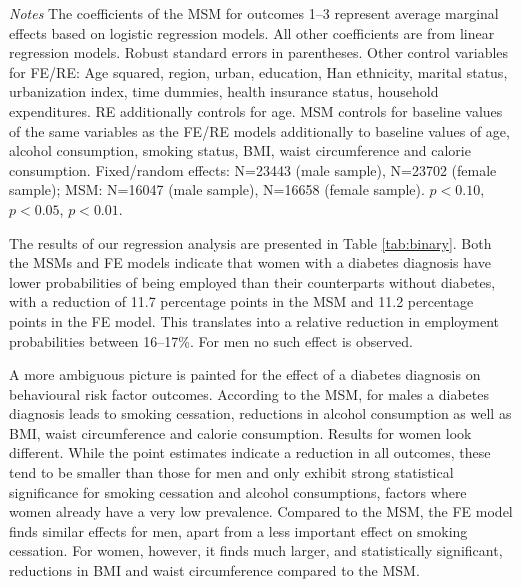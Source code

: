 \begin{table}[p]
\begin{adjustbox}{max width=\linewidth, center}
\begin{threeparttable}
{\begin{tabular}{l*{6}{S
S}}
\bottomrule
\end{tabular}
\begin{tablenotes}
\item \footnotesize \textit{Notes} The coefficients of the MSM for outcomes 1--3 represent average marginal effects based on logistic regression models. All other coefficients are from linear regression models. Robust standard errors in parentheses. Other control variables for FE/RE: Age squared, region, urban, education, Han ethnicity, marital status, urbanization index, time dummies, health insurance status, household expenditures. RE additionally controls for age. MSM controls for baseline values of the same variables as the FE/RE models additionally to baseline values of age, alcohol consumption, smoking status, BMI, waist circumference and calorie consumption.  Fixed/random effects: N=23443 (male sample), N=23702 (female sample); MSM:  N=16047 (male sample), N=16658 (female sample). \sym{*} \(p<0.10\), \sym{**} \(p<0.05\), \sym{***} \(p<0.01\).
\end{tablenotes}
}
\end{threeparttable}
\end{adjustbox}

\end{table}
The results of our regression analysis are presented in Table \ref{tab:binary}. Both the \acp{MSM} and \ac{FE} models indicate that women with a diabetes diagnosis have lower probabilities of being employed than their counterparts without diabetes, with a reduction of 11.7 percentage points in the \ac{MSM} and 11.2 percentage points in the \ac{FE} model. This translates into a relative reduction in employment probabilities between 16--17\%. For men no such effect is observed.



A more ambiguous picture is painted for the effect of a diabetes diagnosis on behavioural risk factor outcomes. According to the \ac{MSM}, for males a diabetes diagnosis leads to smoking cessation, reductions in alcohol consumption as well as \ac{BMI}, waist circumference and calorie consumption. Results for women look different. While the point estimates indicate a reduction in all outcomes, these tend to be smaller than those for men and only exhibit strong statistical significance for smoking cessation and alcohol consumptions, factors where women already have a very low prevalence. Compared to the \ac{MSM}, the \ac{FE} model finds similar effects for men, apart from a less important effect on smoking cessation.	For women, however, it finds much larger, and statistically significant, reductions in \ac{BMI} and waist circumference compared to the \ac{MSM}. 

